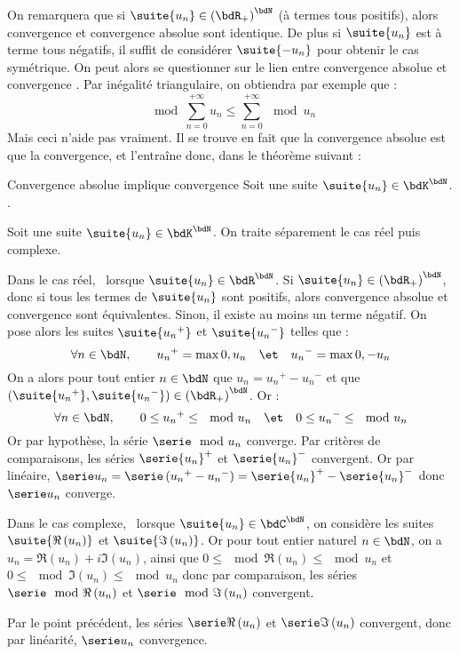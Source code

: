 \documentclass[a4paper,french,bookmarks]{article}
\begin{document}
On remarquera que si $\suite{u_n} \in \left(\bdR_+\right)^\bdN$ (à termes tous positifs), alors convergence et convergence absolue sont identique. De plus si $\suite{u_n}$ est à terme tous négatifs, il suffit de considérer $\suite{-u_n}$ pour obtenir le cas symétrique. On peut alors se questionner sur le lien entre convergence absolue et convergence . Par inégalité triangulaire, on obtiendra par exemple que :
%
\[ \mod{\sum_{n=0}^{+\infty} u_n} \leq \sum_{n=0}^{+\infty} \mod{u_n}\]
%
Mais ceci n'aide pas vraiment. Il se trouve en fait que la convergence absolue est  que la convergence, et l'entraîne donc, dans le théorème suivant :
%
\begin{theorem}{Convergence absolue implique convergence}{}
    Soit une suite $\suite{u_n} \in \bdK^\bdN$. .
\end{theorem}
%
\begin{nproof}
    Soit une suite $\suite{u_n} \in \bdK^\bdN$. On traite séparement le cas réel puis complexe.
    
    \begin{enumerate}
        \itt Dans le cas réel, \ie\ lorsque $\suite{u_n} \in \bdR^\bdN$. Si $\suite{u_n} \in \left(\bdR_+\right)^\bdN$, donc si tous les termes de $\suite{u_n}$ sont positifs, alors convergence absolue et convergence sont équivalentes. Sinon, il existe au moins un terme négatif. On pose alors les suites $\suite{{u_n}^+}$ et $\suite{{u_n}^-}$ telles que :
        \[ \forall n \in \bdN,\qquad {u_n}^+ = \max{0, u_n} \quad\et\quad {u_n}^- = \max{0, -u_n}\]
        On a alors pour tout entier $n \in \bdN$ que $u_n = {u_n}^+ - {u_n}^-$ et que $\left(\suite{{u_n}^+}, \suite{{u_n}^-}\right) \in \left(\bdR_+\right)^\bdN$. Or :
        \[ \forall n \in \bdN,\qquad 0 \leq {u_n}^+ \leq \mod{u_n} \quad\et\quad 0 \leq {u_n}^- \leq \mod{u_n}\]
        Or par hypothèse, la série $\serie \mod{u_n}$ converge. Par critères de comparaisons, les séries $\serie {u_n}^+$ et $\serie {u_n}^-$ convergent. Or par linéaire, $\serie u_n = \serie \left({u_n}^+ - {u_n}^-\right) = \serie {u_n}^+ - \serie {u_n}^-$ donc $\serie u_n$ converge.
        
        \itt Dans le cas complexe, \ie\ lorsque $\suite{u_n} \in \bdC^\bdN$, on considère les suites $\suite{\Re\left(u_n\right)}$ et $\suite{\Im\left(u_n\right)}$. Or pour tout entier naturel $n \in \bdN$, on a $u_n = \Re\left(u_n\right) + i\Im\left(u_n\right)$, ainsi que $0 \leq \mod{\Re\left(u_n\right)} \leq \mod{u_n}$ et $0 \leq \mod{\Im\left(u_n\right)} \leq \mod{u_n}$ donc par comparaison, les séries $\serie \mod{\Re\left(u_n\right)}$ et $\serie \mod{\Im\left(u_n\right)}$ convergent. 
        
        Par le point précédent, les séries $\serie \Re\left(u_n\right)$ et $\serie \Im\left(u_n\right)$ convergent, donc par linéarité, $\serie u_n$ convergence.
    \end{enumerate}
\end{nproof}
\end{document}
